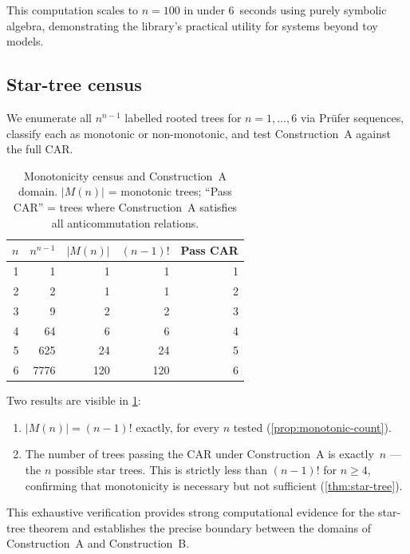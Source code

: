 This computation scales to $n = 100$ in under 6~seconds using purely
symbolic algebra, demonstrating the library's practical utility for
systems beyond toy models.

\subsection{Star-tree census}
\label{sec:val-census}

We enumerate all $n^{n-1}$ labelled rooted trees for $n = 1, \ldots,
6$ via Pr\"ufer sequences, classify each as monotonic or
non-monotonic, and test Construction~A against the full CAR.

\begin{table}[t]
\centering
\caption{Monotonicity census and Construction~A domain.  $|M(n)|$ =
  monotonic trees; ``Pass CAR'' = trees where Construction~A
  satisfies all anticommutation relations.}
\label{tab:monotonicity}
\begin{tabular}{@{}rrrrr@{}}
\toprule
$n$ & $n^{n-1}$ & $|M(n)|$ & $(n{-}1)!$ & Pass CAR \\
\midrule
1 &       1 &     1 &     1 &  1 \\
2 &       2 &     1 &     1 &  2 \\
3 &       9 &     2 &     2 &  3 \\
4 &      64 &     6 &     6 &  4 \\
5 &     625 &    24 &    24 &  5 \\
6 &    7776 &   120 &   120 &  6 \\
\bottomrule
\end{tabular}
\end{table}

Two results are visible in \cref{tab:monotonicity}:
\begin{enumerate}
  \item $|M(n)| = (n{-}1)!$ exactly, for every $n$ tested
    (\cref{prop:monotonic-count}).
  \item The number of trees passing the CAR under Construction~A
    is exactly~$n$ — the $n$ possible star trees.  This is strictly
    less than $(n{-}1)!$ for $n \ge 4$, confirming that monotonicity
    is necessary but not sufficient (\cref{thm:star-tree}).
\end{enumerate}

This exhaustive verification provides strong computational evidence
for the star-tree theorem and establishes the precise boundary between
the domains of Construction~A and Construction~B.
